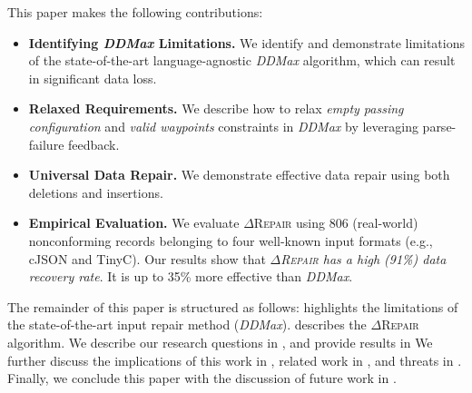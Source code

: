 \documentclass[acmsmall,screen,review,anonymous]{acmart}
\newcommand{\dtask}{data repair\xspace}
\newcommand{\approach}{\textsc{$\Delta$Repair}\xspace}
\newcommand{\ddmax}{\textit{DDMax}\xspace}
\newcommand{\drepair}{\approach}
\begin{document}
This paper makes the following
contributions:
\begin{itemize}
\item \textbf{Identifying \ddmax Limitations.}
We identify and demonstrate limitations of 
the state-of-the-art language-agnostic \ddmax algorithm, which can result in significant data loss.
\item \textbf{Relaxed Requirements.} We describe how to relax
\emph{empty passing configuration} and \emph{valid waypoints} constraints in \ddmax by leveraging parse-failure feedback.
\item \textbf{Universal Data Repair.}
We demonstrate effective \dtask using both deletions and insertions.
\item \textbf{Empirical Evaluation.} We evaluate \drepair using 806 (real-world) nonconforming
records belonging to four well-known input formats (e.g., cJSON and TinyC). 
Our results show that
\textit{\drepair has a high (91\%) data recovery rate}. 
It is up to 35\% more effective than \ddmax.

\end{itemize}

The remainder of this paper is structured as follows: 
 highlights the limitations of the 
state-of-the-art input repair method (\ddmax).
describes the \drepair algorithm. We describe our research questions in
, and provide results in 
We further discuss the implications of this work in ,
related work in , and threats in .
Finally, we conclude this paper 
with the discussion of future work in . 
\end{document}
